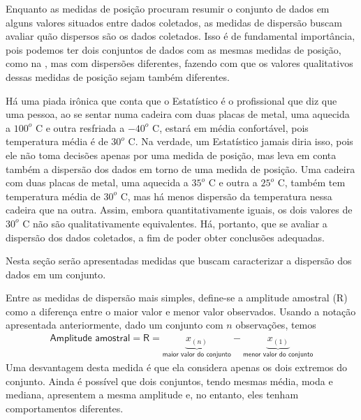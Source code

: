 Enquanto as medidas de posição procuram resumir o conjunto de dados em alguns valores situados entre dados coletados, as medidas de dispersão buscam avaliar quão dispersos são os dados coletados. Isso é de fundamental importância, pois podemos ter dois conjuntos de dados com as mesmas medidas de posição, como na , mas com dispersões diferentes, fazendo com que os valores qualitativos dessas medidas de posição sejam também diferentes.

Há uma piada irônica que conta que o Estatístico é o profissional que diz que uma pessoa, ao se sentar numa cadeira com duas placas de metal, uma aquecida a \(100^o\) C e outra resfriada a \(-40^o\) C, estará em média confortável, pois temperatura média é de \(30^o\) C. Na verdade, um Estatístico jamais diria isso, pois ele não toma decisões apenas por uma medida de posição, mas leva em conta também a dispersão dos dados em torno de uma medida de posição. Uma cadeira com duas placas de metal, uma aquecida a \(35^o\) C e outra a \(25^o\) C, também tem temperatura média de \(30^o\) C, mas há menos dispersão da temperatura nessa cadeira que na outra. Assim, embora quantitativamente iguais, os dois valores de \(30^o\) C não são qualitativamente equivalentes. Há, portanto, que se avaliar a dispersão dos dados coletados, a fim de poder obter conclusões adequadas.

Nesta seção serão apresentadas medidas que buscam caracterizar a dispersão dos dados em um conjunto.


Entre as medidas de dispersão mais simples, define-se a amplitude amostral (R) como a diferença entre o maior valor e menor valor observados. Usando a notação apresentada anteriormente, dado um conjunto com \(n\) observações, temos
\begin{equation*}
\begin{split}\textsf{Amplitude amostral}=\textsf{R}= \underbrace{x_{(n)}}_{\textsf{maior valor do conjunto}}-\underbrace{x_{(1)}}_{\textsf{menor valor do conjunto}}\end{split}
\end{equation*}
Uma desvantagem desta medida é que ela considera apenas os dois extremos do conjunto. Ainda é possível que dois conjuntos, tendo mesmas média, moda e mediana, apresentem a mesma amplitude e, no entanto, eles tenham comportamentos diferentes. 

